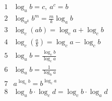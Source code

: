 \documentclass{article}
\begin{document}

\begin{align*}
  1&\log_{a}b = c, ~ a^c = b\\
  2&\log_{a^k}b^m = \frac{m}{k}\log_{a}b\\
  3&\log_{c}(ab) = \log_{c}a + \log_{c}b\\
  4&\log_{c}(\frac{a}{b}) = \log_{c}a - \log_{c}b\\ 
  5&\log_{a}b = \frac{\log_{c}b}{\log_{c}a}\\
  6&\log_{a}b = \frac{1}{\log_{b}a}\\
  7&a^{\log_{c}b} = b^{\log_{c}a}\\
  8&\log_{a}b \cdot \log_{c}d = \log_{c}b \cdot \log_{a}d\\
\end{align*} 
\end{document}
